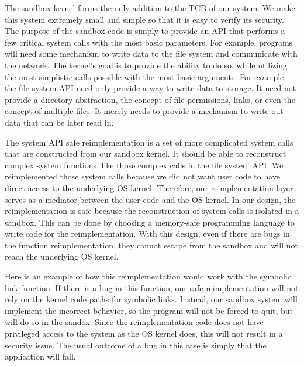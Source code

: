 The sandbox kernel forms the only addition to the TCB of our system.  We 
make this system extremely small and simple so that it is easy to verify its 
security.  The purpose of the sandbox code is simply to provide an API that performs
a few critical system calls with the most basic parameters.  For example,
programs will need some mechanism to write data to the file system
and communicate with the network.  The kernel's goal is to provide the ability
to do so, while utilizing the most simplistic calls possible with the most
basic arguments.  For example, the file system API need only provide a way
to write data to storage.  It need not provide a directory abstraction, the
concept of file permissions, links, or even the concept of multiple files.
It merely needs to provide a mechanism to write out data that can be later
read in.  


The system API safe reimplementation is a set of more complicated system calls 
that are constructed from our sandbox kernel. It should be able to reconstruct 
complex system functions, like those complex calls in the file system API. 
We reimplemented those system calls because we did not want user code 
to have direct access to the underlying OS kernel. 
Therefore, our reimplementation layer serves as a mediator between the user code 
and the OS kernel. In our design, the reimplementation is safe 
because the reconstruction of system calls is isolated in a sandbox. 
This can be done by choosing a memory-safe programming language to write code for the reimplementation. 
With this design, even if there are bugs in the function reimplementation, 
they cannot escape from the sandbox and will not reach the underlying OS kernel. 

Here is an example of how this reimplementation would work with the symbolic link function. 
  
If there is a bug in this function, our safe reimplementation will not rely on the kernel code paths for symbolic links. 
Instead, our sandbox system will implement the incorrect behavior, so the program will not be forced to quit, but will do so in the sandox.   
Since the reimplementation code does not have privileged access to the system as the OS kernel does, 
this will not result in a security issue. The usual outcome of a bug in this case is simply that the application will fail.

